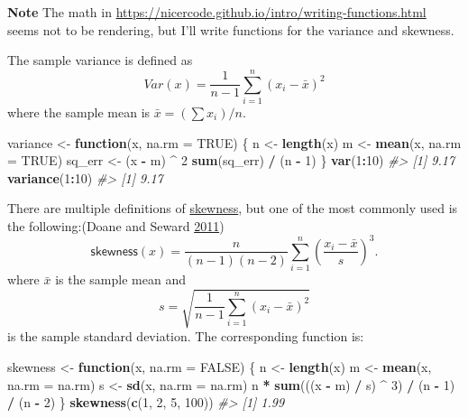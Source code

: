 \documentclass[]{book}
\newenvironment{Shaded}{\begin{snugshade}}{\end{snugshade}}
\newcommand{\CommentTok}[1]{\textcolor[rgb]{0.56,0.35,0.01}{\textit{#1}}}
\newcommand{\ControlFlowTok}[1]{\textcolor[rgb]{0.13,0.29,0.53}{\textbf{#1}}}
\newcommand{\DataTypeTok}[1]{\textcolor[rgb]{0.13,0.29,0.53}{#1}}
\newcommand{\DecValTok}[1]{\textcolor[rgb]{0.00,0.00,0.81}{#1}}
\newcommand{\KeywordTok}[1]{\textcolor[rgb]{0.13,0.29,0.53}{\textbf{#1}}}
\newcommand{\NormalTok}[1]{#1}
\newcommand{\OperatorTok}[1]{\textcolor[rgb]{0.81,0.36,0.00}{\textbf{#1}}}
\newcommand{\OtherTok}[1]{\textcolor[rgb]{0.56,0.35,0.01}{#1}}
\newcommand{\StringTok}[1]{\textcolor[rgb]{0.31,0.60,0.02}{#1}}
\theoremstyle{plain}
\theoremstyle{remark}
\begin{document}
\textbf{Note} The math in
\url{https://nicercode.github.io/intro/writing-functions.html} seems not
to be rendering, but I'll write functions for the variance and skewness.

The sample variance is defined as \[
Var(x) = \frac{1}{n - 1} \sum_{i=1}^n (x_i - \bar{x}) ^2
\] where the sample mean is \(\bar{x} = (\sum x_i) / n\).

\begin{Shaded}
\begin{Highlighting}[]
\NormalTok{variance <-}\StringTok{ }\ControlFlowTok{function}\NormalTok{(x, }\DataTypeTok{na.rm =} \OtherTok{TRUE}\NormalTok{) \{}
\NormalTok{  n <-}\StringTok{ }\KeywordTok{length}\NormalTok{(x)}
\NormalTok{  m <-}\StringTok{ }\KeywordTok{mean}\NormalTok{(x, }\DataTypeTok{na.rm =} \OtherTok{TRUE}\NormalTok{)}
\NormalTok{  sq_err <-}\StringTok{ }\NormalTok{(x }\OperatorTok{-}\StringTok{ }\NormalTok{m) }\OperatorTok{^}\StringTok{ }\DecValTok{2}
  \KeywordTok{sum}\NormalTok{(sq_err) }\OperatorTok{/}\StringTok{ }\NormalTok{(n }\OperatorTok{-}\StringTok{ }\DecValTok{1}\NormalTok{)}
\NormalTok{\}}
\KeywordTok{var}\NormalTok{(}\DecValTok{1}\OperatorTok{:}\DecValTok{10}\NormalTok{)}
\CommentTok{#> [1] 9.17}
\KeywordTok{variance}\NormalTok{(}\DecValTok{1}\OperatorTok{:}\DecValTok{10}\NormalTok{)}
\CommentTok{#> [1] 9.17}
\end{Highlighting}
\end{Shaded}

There are multiple definitions of
\href{https://en.wikipedia.org/wiki/Skewness}{skewness}, but one of the
most commonly used is the following:(Doane and Seward
\protect\hyperlink{ref-DoaneSeward2011}{2011}) \[
\mathsf{skewness}(x) = \frac{n}{(n - 1)(n - 2)} \sum_{i = 1}^{n} {\left( \frac{x_i - \bar{x}}{s} \right)}^{3} .
\] where \(\bar{x}\) is the sample mean and \[
s = \sqrt{\frac{1}{n - 1} \sum_{i = 1}^{n} (x_i - \bar{x})^2}
\] is the sample standard deviation. The corresponding function is:

\begin{Shaded}
\begin{Highlighting}[]
\NormalTok{skewness <-}\StringTok{ }\ControlFlowTok{function}\NormalTok{(x, }\DataTypeTok{na.rm =} \OtherTok{FALSE}\NormalTok{) \{}
\NormalTok{  n <-}\StringTok{ }\KeywordTok{length}\NormalTok{(x)}
\NormalTok{  m <-}\StringTok{ }\KeywordTok{mean}\NormalTok{(x, }\DataTypeTok{na.rm =}\NormalTok{ na.rm)}
\NormalTok{  s <-}\StringTok{ }\KeywordTok{sd}\NormalTok{(x, }\DataTypeTok{na.rm =}\NormalTok{ na.rm)}
\NormalTok{  n }\OperatorTok{*}\StringTok{ }\KeywordTok{sum}\NormalTok{(((x }\OperatorTok{-}\StringTok{ }\NormalTok{m) }\OperatorTok{/}\StringTok{ }\NormalTok{s) }\OperatorTok{^}\StringTok{ }\DecValTok{3}\NormalTok{) }\OperatorTok{/}\StringTok{ }\NormalTok{(n }\OperatorTok{-}\StringTok{ }\DecValTok{1}\NormalTok{) }\OperatorTok{/}\StringTok{ }\NormalTok{(n }\OperatorTok{-}\StringTok{ }\DecValTok{2}\NormalTok{)}
\NormalTok{\}}
\KeywordTok{skewness}\NormalTok{(}\KeywordTok{c}\NormalTok{(}\DecValTok{1}\NormalTok{, }\DecValTok{2}\NormalTok{, }\DecValTok{5}\NormalTok{, }\DecValTok{100}\NormalTok{))}
\CommentTok{#> [1] 1.99}
\end{Highlighting}
\end{Shaded}
\end{document}
